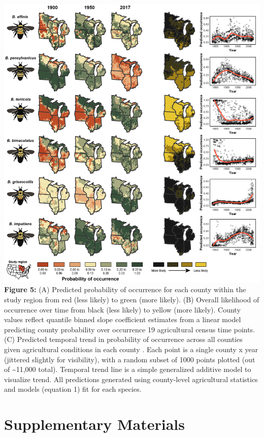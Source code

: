 \documentclass[11pt,]{article}
\begin{document}
\includegraphics[width=1\textwidth,height=\textheight]{../ms_figs/fig_4.png}
\textbf{Figure 5:} (A) Predicted probability of occurrence for each
county within the study region from red (less likely) to green (more
likely). (B) Overall likelihood of occurrence over time from black (less
likely) to yellow (more likely). County values reflect quantile binned
slope coefficient estimates from a linear model predicting county
probability over occurrence 19 agricultural census time points. (C)
Predicted temporal trend in probability of occurrence across all
counties given agricultural conditions in each county . Each point is a
single county x year (jittered slightly for visibility), with a random
subset of 1000 points plotted (out of \textasciitilde{}11,000 total).
Temporal trend line is a simple generalized additive model to visualize
trend. All predictions generated using county-level agricultural
statistics and models (equation 1) fit for each species. \clearpage

\newpage

\hypertarget{supplementary-materials}{%
\section{Supplementary Materials}\label{supplementary-materials}}
\end{document}
